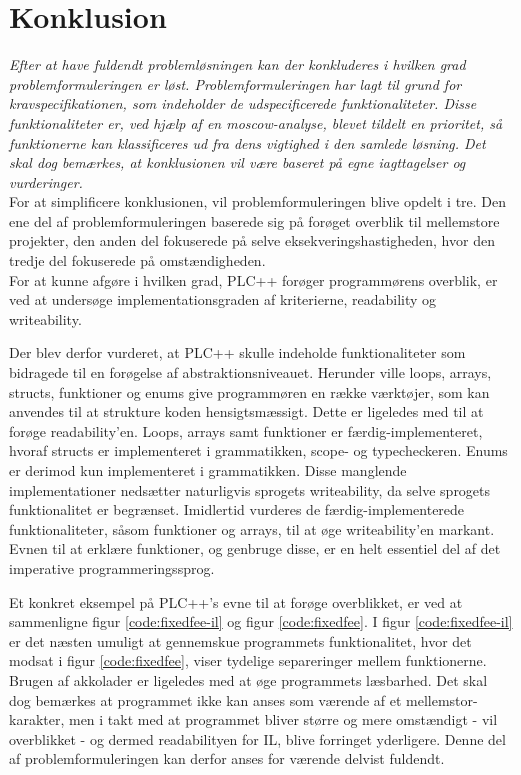 \chapter{Konklusion}
\label{sec:konklusion}

\textit{Efter at have fuldendt problemløsningen kan der konkluderes i hvilken grad problemformuleringen er løst. Problemformuleringen har lagt til grund for kravspecifikationen, som indeholder de udspecificerede funktionaliteter. Disse funktionaliteter er, ved hjælp af en \gls{moscow}-analyse, blevet tildelt en prioritet, så funktionerne kan klassificeres ud fra dens vigtighed i den samlede løsning. Det skal dog bemærkes, at konklusionen vil være baseret på egne iagttagelser og vurderinger.} \\

\noindent For at simplificere konklusionen, vil problemformuleringen blive opdelt i tre. Den ene del af problemformuleringen baserede sig på forøget overblik til mellemstore projekter, den anden del fokuserede på selve eksekveringshastigheden, hvor den tredje del fokuserede på omstændigheden. \\

\noindent For at kunne afgøre i hvilken grad, PLC++ forøger programmørens overblik, er ved at undersøge implementationsgraden af kriterierne, readability og writeability.

Der blev derfor vurderet, at PLC++ skulle indeholde funktionaliteter som bidragede til en forøgelse af abstraktionsniveauet. Herunder ville loops, arrays, structs, funktioner og enums give programmøren en række værktøjer, som kan anvendes til at strukture koden hensigtsmæssigt. Dette er ligeledes med til at forøge readability'en. Loops, arrays samt funktioner er færdig-implementeret, hvoraf structs er implementeret i grammatikken, scope- og typecheckeren. Enums er derimod kun implementeret i grammatikken. Disse manglende implementationer nedsætter naturligvis sprogets writeability, da selve sprogets funktionalitet er begrænset. Imidlertid vurderes de færdig-implementerede funktionaliteter, såsom funktioner og arrays, til at øge writeability'en markant. Evnen til at erklære funktioner, og genbruge disse, er en helt essentiel del af det imperative programmeringssprog. 

Et konkret eksempel på PLC++'s evne til at forøge overblikket, er ved at sammenligne figur \ref{code:fixedfee-il} og figur \ref{code:fixedfee}. I figur \ref{code:fixedfee-il} er det næsten umuligt at gennemskue programmets funktionalitet, hvor det modsat i figur \ref{code:fixedfee}, viser tydelige separeringer mellem funktionerne. Brugen af akkolader er ligeledes med at øge programmets læsbarhed. Det skal dog bemærkes at programmet ikke kan anses som værende af et mellemstor-karakter, men i takt med at programmet bliver større og mere omstændigt - vil overblikket - og dermed readabilityen for IL, blive forringet yderligere. Denne del af problemformuleringen kan derfor anses for værende delvist fuldendt. \\

